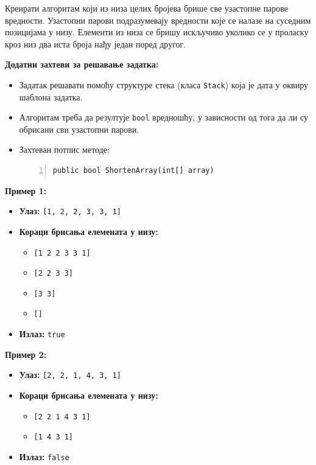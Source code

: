 Креирати алгоритам који из низа целих бројева брише све узастопне парове вредности. Узастопни парови подразумевају вредности које се налазе на суседним позицијама у низу. Елементи из низа се бришу искључиво уколико се у проласку кроз низ два иста броја нађу један поред другог.

\textbf{Додатни захтеви за решавање задатка:}
\begin{itemize}
    \item Задатак решавати помоћу структуре стека (класа \texttt{Stack}) која је дата у оквиру шаблона задатка.
    \item Алгоритам треба да резултује \texttt{bool} вредношћу, у зависности од тога да ли су обрисани сви узастопни парови.
    \item Захтеван потпис методе:
    \begin{Verbatim}[fontsize=\footnotesize, numbers=left, xleftmargin=10mm]
public bool ShortenArray(int[] array)
    \end{Verbatim}
\end{itemize}

\textbf{Пример 1:}
\begin{itemize}
    \item \textbf{Улаз:} \texttt{[1, 2, 2, 3, 3, 1]}
    \item \textbf{Кораци брисања елемената у низу:}
    \begin{itemize}
        \item \texttt{[1\ 2\ 2\ 3\ 3\ 1]}
        \item \texttt{[2\ 2\ 3\ 3]}
        \item \texttt{[3\ 3]}
        \item \texttt{[]}
    \end{itemize}
    \item \textbf{Излаз:} \texttt{true}
\end{itemize}

\textbf{Пример 2:}
\begin{itemize}
    \item \textbf{Улаз:} \texttt{[2, 2, 1, 4, 3, 1]}
    \item \textbf{Кораци брисања елемената у низу:}
    \begin{itemize}
        \item \texttt{[2\ 2\ 1\ 4\ 3\ 1]}
        \item \texttt{[1\ 4\ 3\ 1]}
    \end{itemize}
    \item \textbf{Излаз:} \texttt{false}
\end{itemize}

